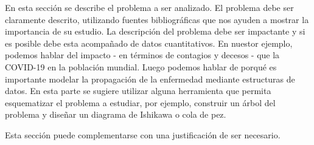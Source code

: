 En esta sección se describe el problema a ser analizado. El problema debe ser claramente descrito, utilizando fuentes bibliográficas que nos ayuden a mostrar la importancia de su estudio. La descripción del problema debe ser impactante y si es posible debe esta acompañado de datos cuantitativos. En nuestor ejemplo, podemos hablar del impacto - en términos de contagios y decesos - que la COVID-19 en la población mundial. Luego podemos hablar de porqué es importante modelar la propagación de la enfermedad mediante estructuras de datos. En esta parte se sugiere utilizar alguna herramienta que permita esquematizar el problema a estudiar, por ejemplo, construir un árbol del problema y diseñar un diagrama de Ishikawa o cola de pez.

Esta sección puede complementarse con una justificación de ser necesario.